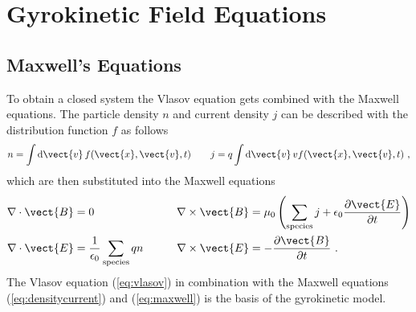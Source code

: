 \newpage
\section{Gyrokinetic Field Equations}
\label{sec:fields}

\subsection{Maxwell's Equations}
\label{sub:maxwellEquations}


To obtain a closed system the Vlasov equation gets combined with the Maxwell equations. The particle density $n$ and current density $j$ can be described with the distribution function $f$ as follows
\begin{gather}
	n = \int \mathrm{d}\vect{v}\,f(\vect{x}, \vect{v}, t) \qquad j = q \int \mathrm{d}\vect{v}\, v f(\vect{x}, \vect{v}, t)~,
	\label{eq:densitycurrent}
\end{gather}
which are then substituted into the Maxwell equations
\begin{gather}
	\begin{aligned}
		\nabla \cdot \vect{B} &= 0 &\qquad \nabla \times \vect{B} &= \mu_0\left( \sum_\mathrm{species} j + \epsilon_0 \frac{\partial \vect{E}}{\partial t} \right) \\
		\nabla \cdot \vect{E} &= \frac{1}{\epsilon_0} \sum_\mathrm{species} qn &\qquad \nabla \times \vect{E} &= - \frac{\partial \vect{B}}{\partial t}~.
	\end{aligned}
	\label{eq:maxwell}
\end{gather}
The Vlasov equation (\ref{eq:vlasov}) in combination with the Maxwell equations (\ref{eq:densitycurrent}) and (\ref{eq:maxwell}) is the basis of the gyrokinetic model. \cite{Krommes2012}